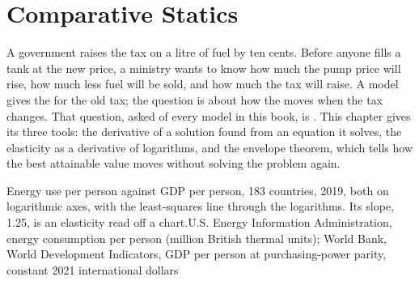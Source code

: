 \chapter{Comparative Statics}\label{ch:b1:comparative-statics}

A government raises the tax on a litre of fuel by ten cents. Before anyone
fills a tank at the new price, a ministry wants to know how much the pump
price will rise, how much less fuel will be sold, and how much the tax will
raise. A model gives the  for the old tax; the question is about
how the  moves when the tax changes. That question, asked of
every model in this book, is . This chapter gives its
three tools: the derivative of a solution found from an equation it solves,
the elasticity as a derivative of logarithms, and the envelope theorem,
which tells how the best attainable value moves without solving the
problem again.

\begin{openingchart}{Energy use per person against GDP per person, 183 countries,
2019, both on logarithmic axes, with the least-squares line through the
logarithms. Its slope, 1.25, is an elasticity read off a chart.}{U.S. Energy
Information Administration, energy consumption per person (million British
thermal units); World Bank, World Development Indicators, GDP per person at
purchasing-power parity, constant 2021 international dollars}
\end{openingchart}

